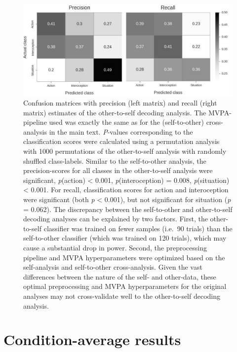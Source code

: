 \documentclass[12pt,american,a4paper,oneside,]{memoir} %
\begin{document}
\newpage
\pagestyle{empty}

\begin{figure}
\centering
\includegraphics{_bookdown_files/shared-states-files/figures/figure_S7.pdf}
\caption{\label{fig:fig-shared-states-S7}Confusion matrices with precision (left matrix) and recall (right matrix) estimates of the other-to-self decoding analysis. The MVPA-pipeline used was exactly the same as for the (self-to-other) cross-analysis in the main text. \emph{P}-values corresponding to the classification scores were calculated using a permutation analysis with 1000 permutations of the other-to-self analysis with randomly shuffled class-labels. Similar to the self-to-other analysis, the precision-scores for all classes in the other-to-self analysis were significant, \emph{p}(action) \textless{} 0.001, \emph{p}(interoception) = 0.008, \emph{p}(situation) \textless{} 0.001. For recall, classification scores for action and interoception were significant (both \emph{p} \textless{} 0.001), but not significant for situation (\emph{p} = 0.062). The discrepancy between the self-to-other and other-to-self decoding analyses can be explained by two factors. First, the other-to-self classifier was trained on fewer samples (i.e.~90 trials) than the self-to-other classifier (which was trained on 120 trials), which may cause a substantial drop in power. Second, the preprocessing pipeline and MVPA hyperparameters were optimized based on the self-analysis and self-to-other cross-analysis. Given the vast differences between the nature of the self- and other-data, these optimal preprocessing and MVPA hyperparameters for the original analyses may not cross-validate well to the other-to-self decoding analysis.}
\end{figure}



\newpage
\pagestyle{empty}

\hypertarget{condition-average-results}{%
\section{Condition-average results}\label{condition-average-results}}
\end{document}
